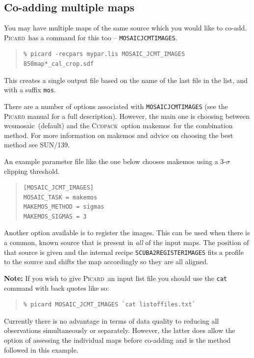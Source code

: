 \documentclass[twoside,11pt]{article}
\newcommand{\xref}[3]{#1}
\newcommand{\xlabel}[1]{}
\renewcommand{\_}{\texttt{\symbol{95}}}
\newenvironment{myquote}{\begin{quote}\begin{small}}{\end{small}\end{quote}}
\newcommand{\ccdpack}{\xref{\textsc{Ccdpack}}{sun139}{}}
\newcommand{\picard}{\xref{\textsc{Picard}}{sun265}{}}
\newcommand{\task}[1]{\textsf{#1}}
\newcommand{\param}[1]{\texttt{#1}}
\newcommand{\wcsmosaic}{\xref{\task{wcsmosaic}}{sun95}{WCSMOSAIC}}
\newcommand{\makemos}{\xref{\task{makemos}}{sun139}{MAKEMOS}}
\begin{document}
\subsection{\xlabel{coadd}Co-adding multiple maps}
\label{sec:coadd}

You may have multiple maps of the same source which you would like to
co-add. \picard\ has a command for this too --
\param{MOSAIC\_JCMT\_IMAGES}.
\begin{myquote}
\begin{verbatim}
% picard -recpars mypar.lis MOSAIC_JCMT_IMAGES 850map*_cal_crop.sdf
\end{verbatim}
\end{myquote}
This creates a single output file based on the name of the last file
in the list, and with a suffix \texttt{\_mos}.

There are a number of options associated with
\param{MOSAIC\_JCMT\_IMAGES} (see the \textsc{Picard} manual for a full
description). However, the main one is choosing between \wcsmosaic\
(default) and the \ccdpack\ option \makemos\ for the combination
method. For more information on \task{makemos} and advice on choosing the
best method see SUN/139.

An example parameter file like the one below chooses \task{makemos} using a
3-$\sigma$ clipping threshold.
\begin{myquote}
\begin{verbatim}
[MOSAIC_JCMT_IMAGES]
MOSAIC_TASK = makemos
MAKEMOS_METHOD = sigmas
MAKEMOS_SIGMAS = 3
\end{verbatim}
\end{myquote}
Another option available is to register the images. This can be used
when there is a common, known source that is present in \emph{all} of
the input maps. The position of that source is given and the internal
recipe \param{SCUBA2\_REGISTER\_IMAGES} fits a profile to the source
and shifts the map accordingly so they are all aligned.

\textbf{Note:} If you wish to give \picard\ an input list file you should
use the \texttt{cat} command with back quotes like so:
\begin{myquote}
\begin{verbatim}
% picard MOSAIC_JCMT_IMAGES `cat listoffiles.txt`
\end{verbatim}
\end{myquote}


Currently there is no advantage in terms of data quality to reducing
all observations simultaneously or separately. However, the latter
does allow the option of assessing the individual maps before co-adding
and is the method followed in this example.
\end{document}
